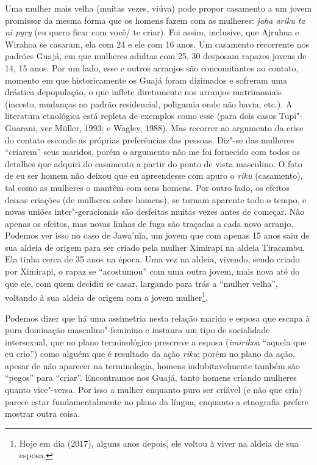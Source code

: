 Uma mulher mais velha (muitas vezes, viúva) pode propor casamento a um
jovem promissor da mesma forma que os homens fazem com as mulheres:
\emph{jaha ariku ta ni pyry} (eu quero ficar com você/ te criar). Foi
assim, inclusive, que Ajruhua e Wirahoa se casaram, ela com 24 e ele com
16 anos. Um casamento recorrente nos padrões Guajá, em que mulheres
adultas com 25, 30 desposam rapazes jovens de 14, 15 anos. Por um lado,
esse e outros arranjos são concomitantes ao contato, momento em que
historicamente os Guajá foram dizimados e sofreram uma drástica
depopulação, o que inflete diretamente nos arranjos matrimoniais
(incesto, mudanças no padrão residencial, poligamia onde não havia,
etc.). A literatura etnológica está repleta de exemplos como esse (para
dois casos Tupi"-Guarani, ver Müller, 1993; e Wagley, 1988). Mas recorrer
ao argumento da crise do contato esconde as próprias preferências das
pessoas. Diz"-se das mulheres ``criarem'' seus maridos, porém o argumento
não me foi fornecido com todos os detalhes que adquiri do casamento a
partir do ponto de vista masculino. O fato de eu ser homem não deixou
que eu apreendesse com apuro o \emph{riku} (casamento), tal como as
mulheres o mantêm com seus homens. Por outro lado, os efeitos dessas
criações (de mulheres sobre homens), se tornam aparente todo o tempo, e
novas uniões inter"-geracionais são desfeitas muitas vezes antes de
começar. Não apenas os efeitos, mas novas linhas de fuga são traçadas a
cada novo arranjo. Podemos ver isso no caso de Jawa'nĩa, um jovem que
com apenas 15 anos saiu de sua aldeia de origem para ser criado pela
mulher Ximirapi na aldeia Tiracambu. Ela tinha cerca de 35 anos na
época. Uma vez na aldeia, vivendo, sendo criado por Ximirapi, o rapaz se
``acostumou'' com uma outra jovem, mais nova até do que ele, com quem
decidiu se casar, largando para trás a ``mulher velha'', voltando à sua
aldeia de origem com a jovem mulher\footnote{Hoje em dia (2017), alguns
  anos depois, ele voltou à viver na aldeia de sua esposa.}.

Podemos dizer que há uma assimetria nesta relação marido e esposa que
escapa à pura dominação masculino"-feminino e instaura um tipo de
socialidade intersexual, que no plano terminológico prescreve a esposa
(\emph{imirikoa} ``aquela que eu crio'') como alguém que é resultado da
ação \emph{riku}; porém no plano da ação, apesar de não aparecer na
terminologia, homens indubitavelmente também são ``pegos'' para
``criar''. Encontramos nos Guajá, tanto homens criando mulheres quanto
vice"-versa. Por isso a mulher enquanto puro ser criável (e não que cria)
parece estar fundamentalmente no plano da língua, enquanto a etnografia
prefere mostrar outra coisa.

